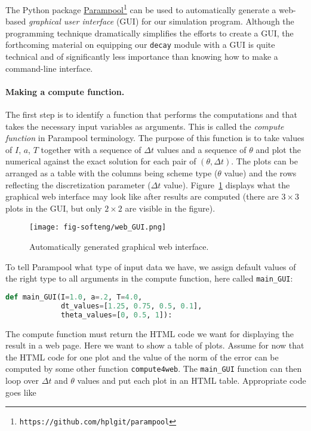 \documentclass[graybox,sectrefs,envcountresetchap,open=right,final]{svmonodo}
\begin{document}
The Python package \href{{https://github.com/hplgit/parampool}}{Parampool}\footnote{\texttt{https://github.com/hplgit/parampool}}
can be used to automatically generate a web-based \emph{graphical user interface}
(GUI) for our simulation program. Although the programming technique
dramatically simplifies the efforts to create a GUI, the forthcoming
material on equipping our \texttt{decay} module with a GUI is quite technical
and of significantly less importance than knowing how to make
a command-line interface.

\paragraph{Making a compute function.}
The first step is to identify a function
that performs the computations and that takes the necessary input
variables as arguments. This is called the \emph{compute function} in
Parampool terminology. The purpose of this function is to take
values of $I$, $a$, $T$ together with a sequence of $\Delta t$ values
and a sequence of $\theta$ and plot the numerical against the
exact solution for each pair of $(\theta, \Delta t)$.
The plots can be arranged as a table with the columns being scheme type
($\theta$ value) and the rows reflecting the discretization parameter
($\Delta t$ value). Figure~\ref{softeng1:fig:GUI} displays what the
graphical web interface may look like after results are computed
(there are $3\times 3$ plots in the GUI, but only $2\times 2$ are
visible in the figure).


\begin{figure}[!ht]  %
  \centerline{\texttt{[image: fig-softeng/web\_GUI.png]}}
  \caption{
  Automatically generated graphical web interface. \label{softeng1:fig:GUI}
  }
\end{figure}



To tell Parampool what type of input data we have,
we assign default values of the right type to all arguments in the
compute function, here called \Verb!main_GUI!:

\begin{lstlisting}[language=Python,style=blue1_bluegreen]
def main_GUI(I=1.0, a=.2, T=4.0,
             dt_values=[1.25, 0.75, 0.5, 0.1],
             theta_values=[0, 0.5, 1]):
\end{lstlisting}

The compute function must return the HTML code we want for displaying
the result in a web page. Here we want to show a
table of plots.
Assume for now that the HTML code for one plot and the value of the
norm of the error can be computed by some other function \texttt{compute4web}.
The \Verb!main_GUI! function can then loop over $\Delta t$ and $\theta$
values and put each plot in an HTML table. Appropriate code goes like
\end{document}
